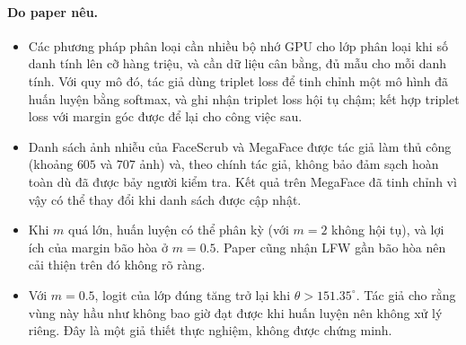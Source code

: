 \documentclass[a4paper,12pt]{article}
\begin{document}
\paragraph{Do paper nêu.}
\begin{itemize}
    \item Các phương pháp phân loại cần nhiều bộ nhớ GPU cho lớp phân loại khi số danh tính lên cỡ hàng triệu, và cần dữ liệu cân bằng, đủ mẫu cho mỗi danh tính. Với quy mô đó, tác giả dùng triplet loss để tinh chỉnh một mô hình đã huấn luyện bằng softmax, và ghi nhận triplet loss hội tụ chậm; kết hợp triplet loss với margin góc được để lại cho công việc sau.
    \item Danh sách ảnh nhiễu của FaceScrub và MegaFace được tác giả làm thủ công (khoảng $605$ và $707$ ảnh) và, theo chính tác giả, không bảo đảm sạch hoàn toàn dù đã được bảy người kiểm tra. Kết quả trên MegaFace đã tinh chỉnh vì vậy có thể thay đổi khi danh sách được cập nhật.
    \item Khi $m$ quá lớn, huấn luyện có thể phân kỳ (với $m = 2$ không hội tụ), và lợi ích của margin bão hòa ở $m = 0.5$. Paper cũng nhận LFW gần bão hòa nên cải thiện trên đó không rõ ràng.
    \item Với $m = 0.5$, logit của lớp đúng tăng trở lại khi $\theta > 151.35^\circ$. Tác giả cho rằng vùng này hầu như không bao giờ đạt được khi huấn luyện nên không xử lý riêng. Đây là một giả thiết thực nghiệm, không được chứng minh.
\end{itemize}
\end{document}

